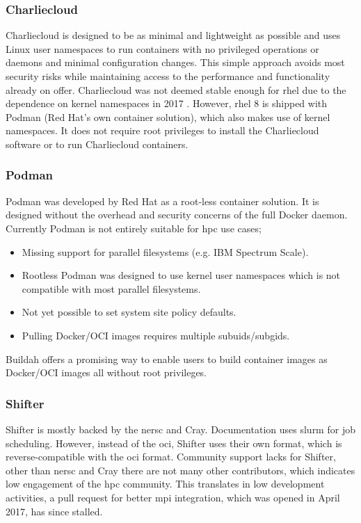\documentclass[conference]{IEEEtran}
\begin{document}
\subsubsection{Charliecloud}
Charliecloud is designed to be as minimal and lightweight as possible and uses Linux user namespaces to run containers with no privileged operations or daemons and minimal configuration changes. This simple approach avoids most security risks while maintaining access to the performance and functionality already on offer. Charliecloud was not deemed stable enough for \gls{rhel} due to the dependence on kernel namespaces in 2017 \cite{kurtzer2017singularity}. However, \gls{rhel} 8 is shipped with Podman (Red Hat's own container solution), which also makes use of kernel namespaces. It does not require root privileges to install the Charliecloud software or to run Charliecloud containers.


\subsubsection{Podman}
Podman was developed by Red Hat as a root-less container solution. It is designed without the overhead and security concerns of the full Docker daemon. Currently Podman is not entirely suitable for \gls{hpc} use cases;
\begin{itemize}
    \item Missing support for parallel filesystems (e.g. IBM Spectrum Scale).
    \item Rootless Podman was designed to use kernel user namespaces which is not compatible with most parallel filesystems.
    \item Not yet possible to set system site policy defaults.
    \item Pulling Docker/OCI images requires multiple subuids/subgids.
\end{itemize}
Buildah offers a promising way to enable users to build container images as Docker/OCI images all without root privileges.


\subsubsection{Shifter}
Shifter is mostly backed by the \gls{nersc} and Cray. Documentation uses \gls{slurm} for job scheduling. However, instead of the \gls{oci}, Shifter uses their own format, which is reverse-compatible with the \gls{oci} format. Community support lacks for Shifter, other than \gls{nersc} and Cray there are not many other contributors, which indicates low engagement of the \gls{hpc} community. This translates in low development activities, a pull request for better \gls{mpi} integration, which was opened in April 2017, has since stalled.
\end{document}

